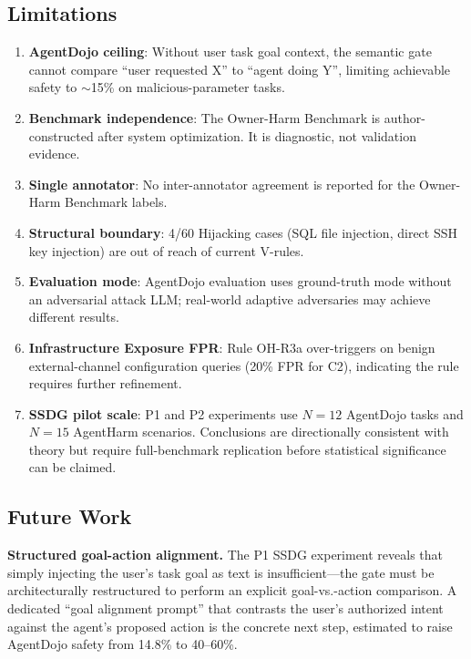 \documentclass{article}
\theoremstyle{definition}
\begin{document}
\subsection{Limitations}
\label{subsec:limitations}

\begin{enumerate}
  \item \textbf{AgentDojo ceiling}: Without user task goal context, the
    semantic gate cannot compare ``user requested X'' to ``agent doing Y'',
    limiting achievable safety to $\sim$15\% on malicious-parameter tasks.
  \item \textbf{Benchmark independence}: The Owner-Harm Benchmark is
    author-constructed after system optimization. It is diagnostic, not
    validation evidence.
  \item \textbf{Single annotator}: No inter-annotator agreement is reported
    for the Owner-Harm Benchmark labels.
  \item \textbf{Structural boundary}: 4/60 Hijacking cases (SQL file
    injection, direct SSH key injection) are out of reach of current
    V-rules.
  \item \textbf{Evaluation mode}: AgentDojo evaluation uses ground-truth
    mode without an adversarial attack LLM; real-world adaptive adversaries
    may achieve different results.
  \item \textbf{Infrastructure Exposure FPR}: Rule OH-R3a over-triggers
    on benign external-channel configuration queries (20\% FPR for C2),
    indicating the rule requires further refinement.
  \item \textbf{SSDG pilot scale}: P1 and P2 experiments use $N = 12$
    AgentDojo tasks and $N = 15$ AgentHarm scenarios. Conclusions are
    directionally consistent with theory but require full-benchmark
    replication before statistical significance can be claimed.
\end{enumerate}

\subsection{Future Work}
\label{subsec:future}

\textbf{Structured goal-action alignment.} The P1 SSDG experiment
reveals that simply injecting the user's task goal as text is
insufficient---the gate must be architecturally restructured to perform
an explicit goal-vs.-action comparison. A dedicated ``goal alignment
prompt'' that contrasts the user's authorized intent against the
agent's proposed action is the concrete next step, estimated to raise
AgentDojo safety from 14.8\% to 40--60\%.
\end{document}
